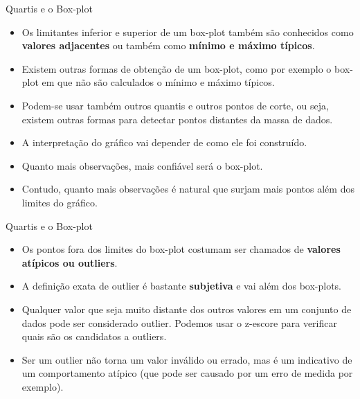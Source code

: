 \documentclass[
  ignorenonframetext,
  serif,
  professionalfont,
  usenames,
  dvipsnames,
  aspectratio = 169]{beamer}
\begin{document}
\begin{frame}{Quartis e o Box-plot}
\label{quartis-e-o-box-plot-6}
\begin{itemize}
\item
  Os limitantes inferior e superior de um box-plot também são conhecidos
  como \textbf{valores adjacentes} ou também como
  \textbf{mínimo e máximo típicos}.
\item
  Existem outras formas de obtenção de um box-plot, como por exemplo o
  box-plot em que não são calculados o mínimo e máximo típicos.
\item
  Podem-se usar também outros quantis e outros pontos de corte, ou seja,
  existem outras formas para detectar pontos distantes da massa de
  dados.
\item
  A interpretação do gráfico vai depender de como ele foi construído.
\item
  Quanto mais observações, mais confiável será o box-plot.
\item
  Contudo, quanto mais observações é natural que surjam mais pontos além
  dos limites do gráfico.
\end{itemize}
\end{frame}

\begin{frame}{Quartis e o Box-plot}
\label{quartis-e-o-box-plot-7}
\begin{itemize}
\item
  Os pontos fora dos limites do box-plot costumam ser chamados de
  \textbf{valores atípicos ou outliers}.
\item
  A definição exata de outlier é bastante \textbf{subjetiva} e vai além
  dos box-plots.
\item
  Qualquer valor que seja muito distante dos outros valores em um
  conjunto de dados pode ser considerado outlier. Podemos usar o
  z-escore para verificar quais são os candidatos a outliers.
\item
  Ser um outlier não torna um valor inválido ou errado, mas é um
  indicativo de um comportamento atípico (que pode ser causado por um
  erro de medida por exemplo).
\end{itemize}
\end{frame}
\end{document}
